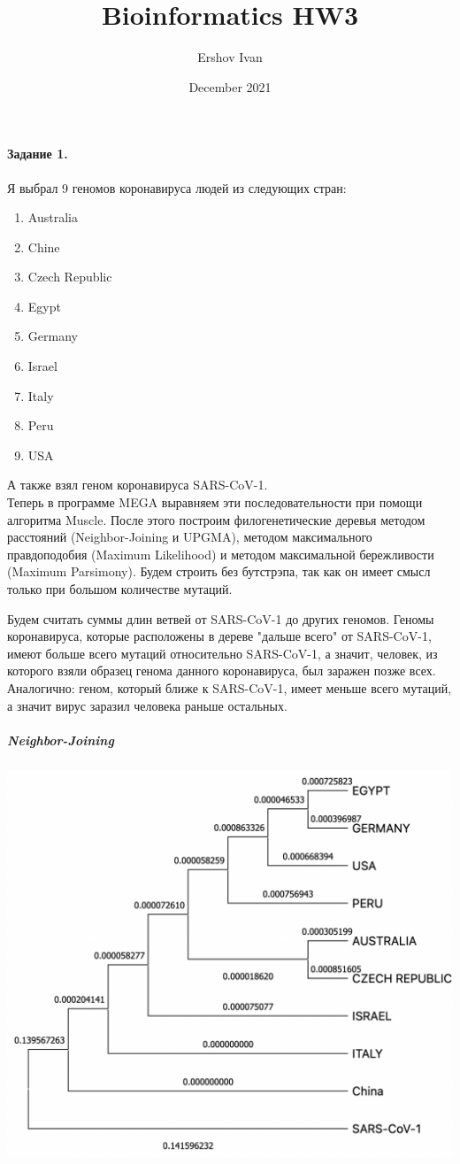 \documentclass[12pt]{article}
\title{Bioinformatics HW3}
\author{Ershov Ivan}
\date{December 2021}
\begin{document}
\maketitle
\paragraph{Задание 1.\\}
Я выбрал 9 геномов коронавируса людей из следующих стран:
\begin{enumerate}
    \itemsep0em
    \item Australia 
    \item Chine
    \item Czech Republic
    \item Egypt
    \item Germany
    \item Israel
    \item Italy
    \item Peru
    \item USA
\end{enumerate}
А также взял геном коронавируса SARS-CoV-1.\\
Теперь в программе MEGA выравняем эти последовательности при помощи алгоритма Muscle. После этого построим филогенетические деревья методом расстояний (Neighbor-Joining и UPGMA), методом максимального правдоподобия (Maximum Likelihood) и методом максимальной бережливости (Maximum Parsimony). Будем строить без бутстрэпа, так как он имеет смысл только при большом количестве мутаций.

\newpage
Будем считать суммы длин ветвей от SARS-CoV-1 до других геномов. Геномы коронавируса, которые расположены в дереве "дальше всего" от SARS-CoV-1, имеют больше всего мутаций относительно SARS-CoV-1, а значит, человек, из которого взяли образец генома данного коронавируса, был заражен позже всех. Аналогично: геном, который ближе к SARS-CoV-1, имеет меньше всего мутаций, а значит вирус заразил человека раньше остальных.

\subparagraph{Neighbor-Joining\\}
\includegraphics[scale=0.7]{images/NJ.png}\\
\end{document}
